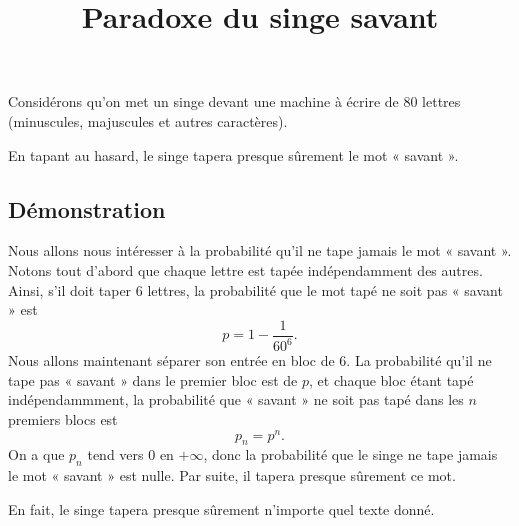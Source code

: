 \documentclass[fontsize=12pt,twoside=false,parskip=half, french]{scrartcl}
\title{Paradoxe du singe savant}
\date{}
\author{}
\begin{document}
\maketitle
   Considérons qu’on met un singe devant une machine à écrire de 80 lettres (minuscules,
   majuscules et autres caractères).
   \begin{Theoreme}
      En tapant au hasard, le singe tapera presque sûrement le mot « savant ».
   \end{Theoreme}
   \subsection{Démonstration}
      Nous allons nous intéresser à la probabilité qu’il ne tape jamais le mot « savant ».
      Notons tout d’abord que chaque lettre est tapée indépendamment des autres. Ainsi,
      s’il doit taper 6 lettres, la probabilité que le mot tapé ne soit pas « savant »
      est
      \[
         p = 1 - \frac{1}{60^6}.
      \]
      Nous allons maintenant séparer son entrée en bloc de $6$. La probabilité 
      qu’il ne tape pas « savant » dans le premier bloc est de $p$, et chaque bloc
      étant tapé indépendammment, la probabilité que « savant » ne soit pas tapé 
      dans les $n$ premiers blocs est
      \[
         p_n = p^n.
      \]
      On a que $p_n$ tend vers $0$ en $+\infty$, donc la probabilité que le singe
      ne tape jamais le mot « savant » est nulle. Par suite, il tapera presque sûrement
      ce mot.
      
      En fait, le singe tapera presque sûrement n’importe quel texte donné.
\end{document}

